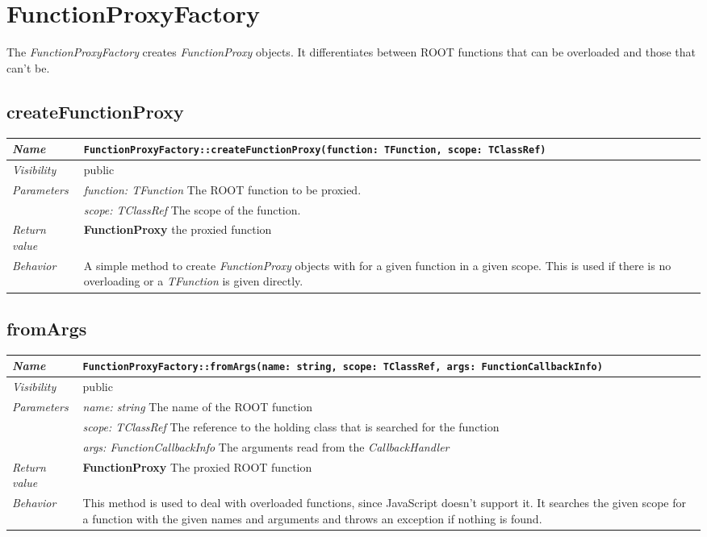 \chapter{FunctionProxyFactory}
The \textit{FunctionProxyFactory} creates \textit{FunctionProxy} objects. It differentiates between ROOT functions that can be overloaded and those that can't be.
\section{createFunctionProxy}
\begin{longtable}{p{3cm} @{\hskip 1cm} p{12cm}}
 \hline
\textit{Name} & \texttt{FunctionProxyFactory::createFunctionProxy(function: TFunction, scope: TClassRef)}\\
\hline
 \textit{Visibility} & public\\
\hline
\textit{Parameters} & \textit{function: TFunction} The ROOT function to be proxied. \\ 
& \textit{scope: TClassRef} The scope of the function.\\
\hline
\textit{Return value} & \textbf{FunctionProxy} the proxied function\\
  \hline
 \textit{Behavior} & A simple method to create \textit{FunctionProxy} objects with for a given function in a given scope. This is used if there is no overloading or a \textit{TFunction} is given directly.\\
\hline
\end{longtable} 
 \section{fromArgs}
\begin{longtable}{p{3cm} @{\hskip 1cm} p{12cm}}
 \hline	
\textit{Name} & \texttt{FunctionProxyFactory::fromArgs(name: string, scope: TClassRef, args: FunctionCallbackInfo)}\\
\hline
 \textit{Visibility} & public\\
\hline
\textit{Parameters} & \textit{name: string} The name of the ROOT function \\ & \textit{scope: TClassRef} The reference to the holding class that is searched for the function \\ &\textit{args: FunctionCallbackInfo} The arguments read from the \textit{CallbackHandler}\\
\hline
\textit{Return value} & \textbf{FunctionProxy} The proxied ROOT function\\
  \hline
 \textit{Behavior} & This method is used to deal with overloaded functions, since JavaScript doesn't support it. It searches the given scope for a function with the given names and arguments and throws an exception if nothing is found.\\
\hline
\end{longtable} \pagebreak

